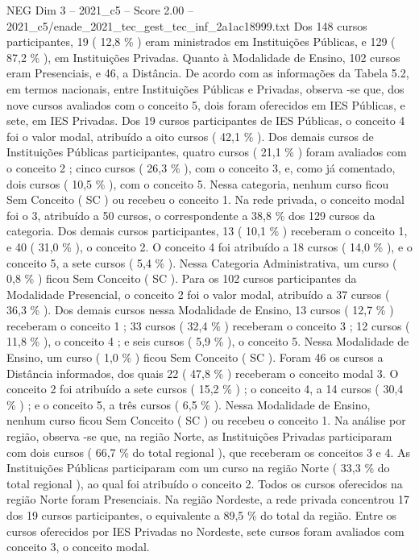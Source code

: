 \begin{textsample}{NEG Dim 3 – 2021\_c5 – Score 2.00 – 2021\_c5/enade\_2021\_tec\_gest\_tec\_inf\_2a1ac18999.txt}
Dos 148 cursos participantes, 19 ( 12,8 \% ) eram ministrados em Instituições Públicas, e 129 ( 87,2 \% ), em Instituições Privadas.
Quanto à Modalidade de Ensino, 102 cursos eram Presenciais, e 46, a Distância.
De acordo com as informações da Tabela 5.2, em termos nacionais, entre Instituições Públicas e Privadas, observa -se que, dos nove cursos avaliados com o conceito 5, dois foram oferecidos em IES Públicas, e sete, em IES Privadas.
Dos 19 cursos participantes de IES Públicas, o conceito 4 foi o valor modal, atribuído a oito cursos ( 42,1 \% ).
Dos demais cursos de Instituições Públicas participantes, quatro cursos ( 21,1 \% ) foram avaliados com o conceito 2 ; cinco cursos ( 26,3 \% ), com o conceito 3, e, como já comentado, dois cursos ( 10,5 \% ), com o conceito 5.
Nessa categoria, nenhum curso ficou Sem Conceito ( SC ) ou recebeu o conceito 1.
Na rede privada, o conceito modal foi o 3, atribuído a 50 cursos, o correspondente a 38,8 \% dos 129 cursos da categoria.
Dos demais cursos participantes, 13 ( 10,1 \% ) receberam o conceito 1, e 40 ( 31,0 \% ), o conceito 2.
O conceito 4 foi atribuído a 18 cursos ( 14,0 \% ), e o conceito 5, a sete cursos ( 5,4 \% ).
Nessa Categoria Administrativa, um curso ( 0,8 \% ) ficou Sem Conceito ( SC ).
Para os 102 cursos participantes da Modalidade Presencial, o conceito 2 foi o valor modal, atribuído a 37 cursos ( 36,3 \% ).
Dos demais cursos nessa Modalidade de Ensino, 13 cursos ( 12,7 \% ) receberam o conceito 1 ; 33 cursos ( 32,4 \% ) receberam o conceito 3 ; 12 cursos ( 11,8 \% ), o conceito 4 ; e seis cursos ( 5,9 \% ), o conceito 5.
Nessa Modalidade de Ensino, um curso ( 1,0 \% ) ficou Sem Conceito ( SC ).
Foram 46 os cursos a Distância informados, dos quais 22 ( 47,8 \% ) receberam o conceito modal 3.
O conceito 2 foi atribuído a sete cursos ( 15,2 \% ) ; o conceito 4, a 14 cursos ( 30,4 \% ) ; e o conceito 5, a três cursos ( 6,5 \% ).
Nessa Modalidade de Ensino, nenhum curso ficou Sem Conceito ( SC ) ou recebeu o conceito 1.
Na análise por região, observa -se que, na região Norte, as Instituições Privadas participaram com dois cursos ( 66,7 \% do total regional ), que receberam os conceitos 3 e 4.
As Instituições Públicas participaram com um curso na região Norte ( 33,3 \% do total regional ), ao qual foi atribuído o conceito 2.
Todos os cursos oferecidos na região Norte foram Presenciais.
Na região Nordeste, a rede privada concentrou 17 dos 19 cursos participantes, o equivalente a 89,5 \% do total da região.
Entre os cursos oferecidos por IES Privadas no Nordeste, sete cursos foram avaliados com conceito 3, o conceito modal.

\end{textsample}
